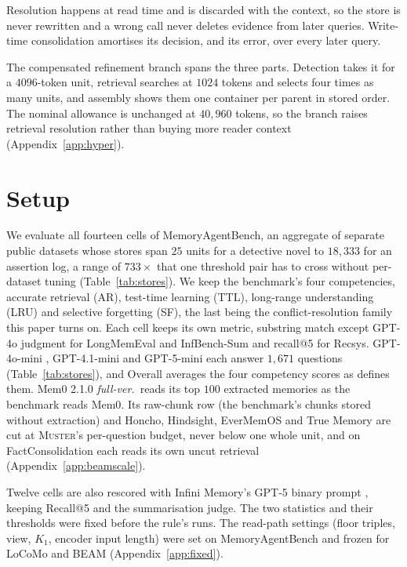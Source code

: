 \documentclass{article}
\newcommand{\sys}{\textsc{Muster}}
\begin{document}
Resolution happens at read time and is discarded with the context, so the store is never rewritten and a
wrong call never deletes evidence from later queries. Write-time consolidation amortises its decision, and
its error, over every later query.

The compensated refinement branch spans the three parts. Detection takes it for a $4096$-token unit, retrieval searches at $1024$ tokens and selects four times as many units, and assembly shows them one container per parent in stored order. The nominal allowance is unchanged at $40{,}960$ tokens, so the branch raises retrieval resolution rather than buying more reader context (Appendix~\ref{app:hyper}).

\section{Setup}\label{sec:setup}

We evaluate all fourteen cells of MemoryAgentBench, an aggregate of separate public datasets whose stores span $25$ units for a detective novel to $18{,}333$ for an assertion log, a range of $733\times$ that one threshold pair has to cross without per-dataset tuning (Table~\ref{tab:stores}). We keep the benchmark's four competencies, accurate retrieval (AR), test-time learning (TTL), long-range understanding (LRU) and selective forgetting (SF), the last being the conflict-resolution family this paper turns on. Each cell keeps its own metric, substring match except GPT-4o judgment for LongMemEval and InfBench-Sum and recall@5 for Recsys. GPT-4o-mini \cite{gpt4omini}, GPT-4.1-mini \cite{gpt41} and GPT-5-mini \cite{gpt5} each answer $1{,}671$ questions (Table~\ref{tab:stores}), and Overall averages the four competency scores as \cite{mab} defines them. Mem0 2.1.0 \emph{full-ver.}\ reads its top $100$ extracted memories as the benchmark reads Mem0. Its raw-chunk row (the benchmark's chunks stored without extraction) and Honcho, Hindsight, EverMemOS and True Memory are cut at \sys{}'s per-question budget, never below one whole unit, and on FactConsolidation each reads its own uncut retrieval (Appendix~\ref{app:beamscale}).

Twelve cells are also rescored with Infini Memory's GPT-5 binary prompt \cite{infini}, keeping Recall@5 and the summarisation judge.
The two statistics and their thresholds were fixed before the rule's runs. The read-path settings (floor
triples, view, $K_1$, encoder input length) were set on MemoryAgentBench and frozen for LoCoMo and BEAM (Appendix~\ref{app:fixed}).
\end{document}
